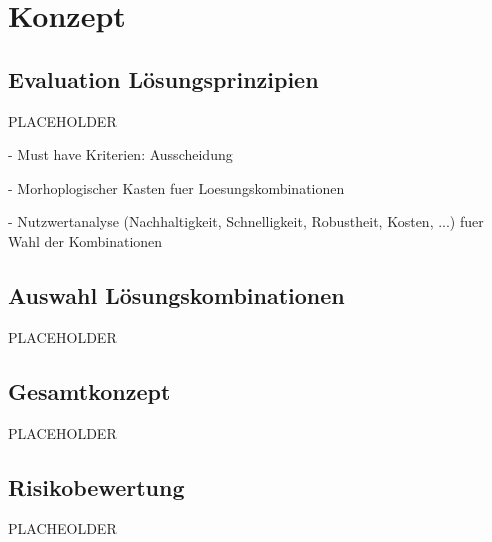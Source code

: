 \section{Konzept}

\subsection{Evaluation Lösungsprinzipien}

PLACEHOLDER

- Must have Kriterien: Ausscheidung

- Morhoplogischer Kasten fuer Loesungskombinationen

- Nutzwertanalyse (Nachhaltigkeit, Schnelligkeit, Robustheit, Kosten, ...) fuer Wahl der Kombinationen


\subsection{Auswahl Lösungskombinationen}

PLACEHOLDER

\subsection{Gesamtkonzept}

PLACEHOLDER

\subsection{Risikobewertung}

PLACHEOLDER